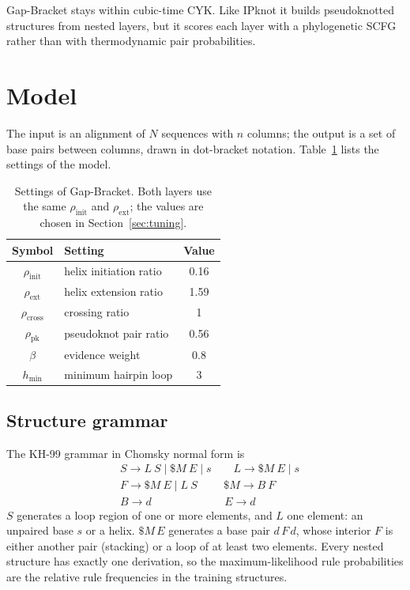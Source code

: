 \documentclass[10pt, twocolumn]{article}
\newcommand{\rinit}{\rho_{\mathrm{init}}}
\newcommand{\rext}{\rho_{\mathrm{ext}}}
\newcommand{\rcross}{\rho_{\mathrm{cross}}}
\newcommand{\rpk}{\rho_{\mathrm{pk}}}
\newcommand{\hmin}{h_{\min}}
\newcommand{\GB}{Gap-Bracket}
\begin{document}
\GB{} stays within cubic-time CYK. Like IPknot it builds pseudoknotted structures from nested layers, but it scores each layer with a phylogenetic SCFG rather than with thermodynamic pair probabilities.

\section{Model}
\label{sec:model}
The input is an alignment of $N$ sequences with $n$ columns; the output is a set of base pairs between columns, drawn in dot-bracket notation. Table~\ref{tab:settings} lists the settings of the model.

\begin{table}[h]
\centering\small
\setlength{\tabcolsep}{4pt}
\begin{tabular}{clc}
\toprule
\textbf{Symbol} & \textbf{Setting} & \textbf{Value}\\
\midrule
$\rinit$ & helix initiation ratio & 0.16\\
$\rext$ & helix extension ratio & 1.59\\
$\rcross$ & crossing ratio & 1\\
$\rpk$ & pseudoknot pair ratio & 0.56\\
$\beta$ & evidence weight & 0.8\\
$\hmin$ & minimum hairpin loop & 3\\
\bottomrule
\end{tabular}
\caption{Settings of \GB{}. Both layers use the same $\rinit$ and $\rext$; the values are chosen in Section~\ref{sec:tuning}.}
\label{tab:settings}
\end{table}

\subsection{Structure grammar}
The KH-99 grammar in Chomsky normal form is
\begin{align*}
    &S \rightarrow L\ S \mid \$M\ E \mid s \qquad L \rightarrow \$M\ E \mid s\\
    &F \rightarrow \$M\ E \mid L\ S \qquad\ \, \$M \rightarrow B\ F\\
    &B \rightarrow d \qquad\qquad\qquad\ \ \, E \rightarrow d
\end{align*}
$S$ generates a loop region of one or more elements, and $L$ one element: an unpaired base $s$ or a helix. $\$M\,E$ generates a base pair $d\,F\,d$, whose interior $F$ is either another pair (stacking) or a loop of at least two elements. Every nested structure has exactly one derivation, so the maximum-likelihood rule probabilities are the relative rule frequencies in the training structures.
\end{document}
